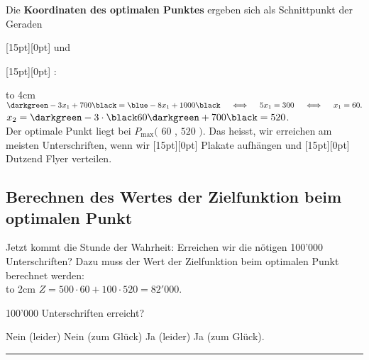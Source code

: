 \documentclass[a4paper,11pt]{exam}
\def\gridtext#1#2{
	\leavevmode\rlap{
		\vbox to #1{\fillwithgrid{#1}}}
		{\hspace{0.2cm}\vbox to #1{\vspace*{-0.2cm}\vfil#2\vfil}
	}%
}
\newcommand*{\grayfillin}[2][2cm]{
	\textcolor[RGB]{200,200,200}{
		\raisebox{0pt}[15pt][0pt]{\null}\fillin[\black #2][#1]
	}
}
\begin{document}
Die \textbf{Koordinaten des optimalen Punktes} ergeben sich als Schnittpunkt der Geraden
\begin{center}
\grayfillin[7cm]{$\darkgreen (1)\quad x_2=-3x_1+700$} und
\grayfillin[7cm]{$\blue (2)\quad x_2=-8x_1+1000$}:
\end{center}

\gridtext{4cm}{
	\ifprintanswers
	$\darkgreen -3x_1+700 \black = \blue -8x_1+1000 \black
	\quad \iff \quad 5x_1 = 300 \quad \iff \quad x_1=60.$
	\vfil
	$x_2=\darkgreen -3\cdot \black 60 \darkgreen + 700 \black = 520$.
	\fi
}\\

Der optimale Punkt liegt bei
$P_{\text{max}}($
\ifprintanswers $60$ \else \hspace{1cm} \fi,
\ifprintanswers $520$ \else \hspace{1cm} \fi$)$. Das heisst, wir erreichen am meisten Unterschriften, wenn wir \grayfillin[2cm]{$60$} Plakate aufhängen und \grayfillin[2cm]{$520$} Dutzend Flyer verteilen.


\subsection{Berechnen des Wertes der Zielfunktion beim optimalen Punkt}

Jetzt kommt die Stunde der Wahrheit: Erreichen wir die nötigen 100'000 Unterschriften? Dazu muss der Wert der Zielfunktion beim optimalen Punkt berechnet werden:\\
\gridtext{2cm}{
	\ifprintanswers
$Z=500\cdot 60 + 100\cdot 520 = 82'000$.
\fi}\\


\checkboxchar{$\Box$}
\checkedchar{$\blacksquare$}

100'000 Unterschriften erreicht?

\begin{oneparcheckboxes}
\choice Nein (leider)
\correctchoice Nein (zum Glück)
\choice Ja (leider)
\choice Ja (zum Glück).
\end{oneparcheckboxes}

\vfill

\hrule
\end{document}
